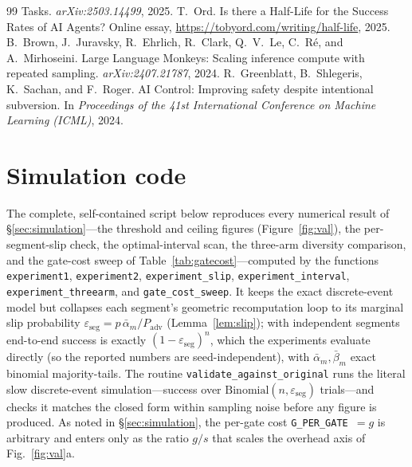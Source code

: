 \documentclass[11pt]{article}
\theoremstyle{remark}
\newcommand{\Padv}{P_{\mathrm{adv}}}
\newcommand{\eseg}{\varepsilon_{\mathrm{seg}}}
\newcommand{\am}{\bar\alpha_m}
\newcommand{\bm}{\bar\beta_m}
\begin{document}
\begin{thebibliography}{99}
Tasks.
\emph{arXiv:2503.14499}, 2025.
 T.~Ord. Is there a Half-Life for the Success Rates of AI Agents?
Online essay, \url{https://tobyord.com/writing/half-life}, 2025.
 B.~Brown, J.~Juravsky, R.~Ehrlich, R.~Clark, Q.~V.~Le, C.~R\'e, and A.~Mirhoseini. Large Language Monkeys: Scaling inference compute
with repeated sampling.
\emph{arXiv:2407.21787}, 2024.
 R.~Greenblatt, B.~Shlegeris, K.~Sachan, and F.~Roger. AI Control: Improving safety despite
intentional subversion. In \emph{Proceedings of the 41st International Conference on Machine Learning (ICML)}, 2024.
\end{thebibliography}

\appendix
\section{Simulation code}\label{app:code}
The complete, self-contained script below reproduces every numerical result of
\S\ref{sec:simulation}---the threshold and ceiling figures (Figure~\ref{fig:val}), the
per-segment-slip check, the optimal-interval scan, the three-arm diversity comparison, and the
gate-cost sweep of Table~\ref{tab:gatecost}---computed by the functions \texttt{experiment1},
\texttt{experiment2}, \texttt{experiment\_slip}, \texttt{experiment\_interval},
\texttt{experiment\_threearm}, and \texttt{gate\_cost\_sweep}.
It keeps the exact
discrete-event model but collapses each segment's geometric recomputation loop to its marginal slip
probability $\eseg=p\,\am/\Padv$ (Lemma~\ref{lem:slip}); with independent segments end-to-end
success is exactly $(1-\eseg)^n$, which the experiments evaluate directly (so the reported numbers
are seed-independent), with $\am,\bm$ exact binomial majority-tails.
The routine
\texttt{validate\_against\_original} runs the literal slow discrete-event simulation---success
over $\mathrm{Binomial}(n,\eseg)$ trials---and checks it matches the closed form within sampling
noise before any figure is produced.
As noted in
\S\ref{sec:simulation}, the per-gate cost \texttt{G\_PER\_GATE}~$=g$ is arbitrary and enters only
as the ratio $g/s$ that scales the overhead axis of Fig.~\ref{fig:val}a.
\end{document}
